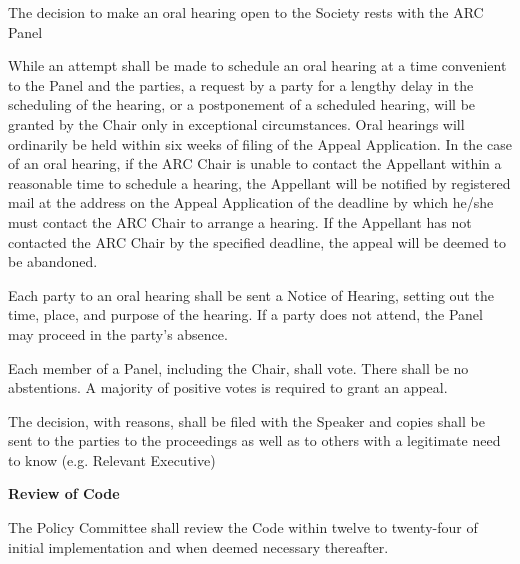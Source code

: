 \begin{longenum}[ label*=\arabic*., align=left]
\begin{longenum}[ label*=\arabic*., align=left]
		\begin{longenum}[ label*=\arabic*., align=left]
			\item  The decision to make an oral hearing open to the Society rests with the ARC Panel
     	 \end{longenum}
	\item While an attempt shall be made to schedule an oral hearing at a time convenient to the Panel and  the  parties,  a  request  by  a  party  for  a  lengthy  delay  in  the  scheduling  of  the  hearing,  or  a postponement  of  a  scheduled  hearing,  will  be  granted  by  the  Chair  only  in  exceptional circumstances.  Oral  hearings  will  ordinarily  be  held  within  six  weeks  of  filing  of  the  Appeal Application.  In  the  case  of  an  oral  hearing,  if  the  ARC  Chair  is  unable  to  contact  the  Appellant within a reasonable time to schedule a hearing, the Appellant will be notified by registered mail at the  address  on  the  Appeal  Application  of  the  deadline  by  which  he/she  must  contact  the  ARC Chair  to  arrange  a  hearing.  If  the  Appellant  has  not  contacted  the  ARC  Chair  by  the  specified deadline, the appeal will be deemed to be abandoned.
	\item Each party to an oral hearing shall be sent a Notice of Hearing, setting out the time, place, and  purpose  of  the  hearing.  If  a  party  does  not  attend,  the  Panel  may  proceed  in  the  party's absence.
    \item Each  member  of  a  Panel,  including  the  Chair,  shall  vote.  There  shall be  no  abstentions.  A majority of positive votes is required to grant an appeal.
	\item The  decision,  with  reasons,  shall  be  filed  with  the  Speaker  and  copies  shall  be  sent  to  the parties  to  the  proceedings  as  well  as  to  others  with  a  legitimate  need  to  know  (e.g.  Relevant Executive) 
      \end{longenum}
\item \textbf{Review of Code}

The Policy Committee shall review the Code within twelve to twenty-four of initial implementation and when deemed necessary thereafter.
\end{longenum}